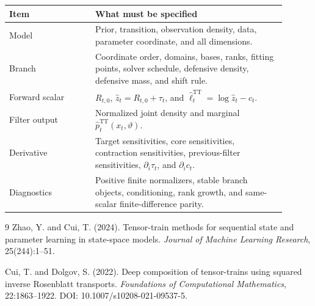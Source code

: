 \documentclass[11pt]{article}
\newcommand{\TT}{\mathrm{TT}}
\theoremstyle{definition}
\theoremstyle{remark}
\begin{document}
\begin{longtable}{@{}p{0.28\linewidth}p{0.62\linewidth}@{}}
\toprule
Item & What must be specified \\
\midrule
\endhead
Model & Prior, transition, observation density, data, parameter coordinate,
and all dimensions. \\
Branch & Coordinate order, domains, bases, ranks, fitting points, solver
schedule, defensive density, defensive mass, and shift rule. \\
Forward scalar & \(R_{t,0}\), \(\widehat z_t=R_{t,0}+\tau_t\), and
\(\widehat\ell_t^{\TT}=\log\widehat z_t-c_t\). \\
Filter output & Normalized joint density and marginal
\(\widehat p_t^{\TT}(x_t,\vartheta)\). \\
Derivative & Target sensitivities, core sensitivities, contraction
sensitivities, previous-filter sensitivities, \(\partial_i\tau_t\), and
\(\partial_i c_t\). \\
Diagnostics & Positive finite normalizers, stable branch objects,
conditioning, rank growth, and same-scalar finite-difference parity. \\
\bottomrule
\end{longtable}

\begin{thebibliography}{9}
Zhao, Y. and Cui, T. (2024).
\newblock Tensor-train methods for sequential state and parameter learning in
state-space models.
\newblock \emph{Journal of Machine Learning Research}, 25(244):1--51.

Cui, T. and Dolgov, S. (2022).
\newblock Deep composition of tensor-trains using squared inverse Rosenblatt
transports.
\newblock \emph{Foundations of Computational Mathematics}, 22:1863--1922.
\newblock DOI: 10.1007/s10208-021-09537-5.
\end{thebibliography}
\end{document}
